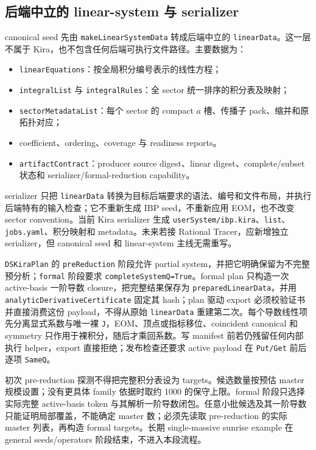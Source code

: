 ﻿\documentclass[a4paper,11pt]{article}
\begin{document}
\subsection{后端中立的 linear-system 与 serializer}

canonical seed 先由 \texttt{makeLinearSystemData} 转成后端中立的 \texttt{linearData}。这一层不属于 Kira，也不包含任何后端可执行文件路径。主要数据为：
\begin{itemize}
  \item \texttt{linearEquations}：按全局积分编号表示的线性方程；
  \item \texttt{integralList} 与 \texttt{integralRules}：全 sector 统一排序的积分表及映射；
  \item \texttt{sectorMetadataList}：每个 sector 的 compact $a$ 槽、传播子 pack、缩并和原拓扑对应；
  \item coefficient、ordering、coverage 与 readiness reports。
  \item \texttt{artifactContract}：producer source digest、linear digest、complete/subset 状态和 serializer/formal-reduction capability。
\end{itemize}

serializer 只把 \texttt{linearData} 转换为目标后端要求的语法、编号和文件布局，并执行后端特有的输入检查；它不重新生成 IBP seed，不重新应用 EOM，也不改变 sector convention。当前 Kira serializer 生成 \texttt{userSystem/ibp.kira}、\texttt{list}、\texttt{jobs.yaml}、积分映射和 metadata。未来若接 Rational Tracer，应新增独立 serializer，但 canonical seed 和 linear-system 主线无需重写。

\texttt{DSKiraPlan} 的 \texttt{preReduction} 阶段允许 partial system，并把它明确保留为不完整预分析；\texttt{formal} 阶段要求 \texttt{completeSystemQ=True}。formal plan 只构造一次 active-basis 一阶导数 closure，把完整结果保存为 \texttt{preparedLinearData}，并用 \texttt{analyticDerivativeCertificate} 固定其 hash；plan 驱动 export 必须校验证书并直接消费这份 payload，不得从原始 \texttt{linearData} 重建第二次。每个导数线性项先分离显式系数与唯一裸 \texttt{J}，EOM、顶点或指标移位、coincident canonical 和 symmetry 只作用于裸积分，随后才乘回系数。写 manifest 前若仍残留任何内部执行 helper，export 直接拒绝；发布检查还要求 active payload 在 \texttt{Put/Get} 前后逐项 \texttt{SameQ}。

初次 pre-reduction 探测不得把完整积分表设为 targets。候选数量按预估 master 规模设置；没有更具体 family 依据时取约 1000 的保守上限。formal 阶段只选择实际完整 active-basis token 与其解析一阶导数闭包。任意小批候选及其一阶导数只能证明局部覆盖，不能确定 master 数；必须先读取 pre-reduction 的实际 master 列表，再构造 formal targets。长期 single-massive sunrise example 在 general seeds/operators 阶段结束，不进入本段流程。
\end{document}
